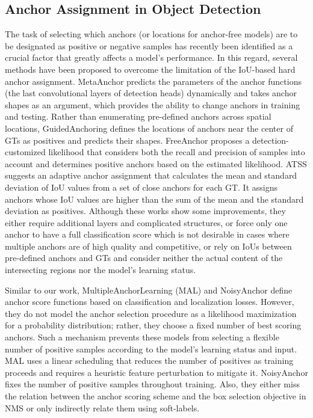 \documentclass[runningheads]{llncs}
\begin{document}
\subsection{Anchor Assignment in Object Detection}
The task of selecting which anchors (or locations for anchor-free models) are to be designated as positive or negative samples has recently been identified as a crucial factor that greatly affects a model's performance\cite{metaanchor, freeanchor, atss}. In this regard, several methods have been proposed to overcome the limitation of the IoU-based hard anchor assignment. MetaAnchor\cite{metaanchor} predicts the parameters of the anchor functions (the last convolutional layers of detection heads) dynamically and takes anchor shapes as an argument, which provides the ability to change anchors in training and testing. Rather than enumerating pre-defined anchors across spatial locations, GuidedAnchoring\cite{guidedanchor} defines the locations of anchors near the center of GTs as positives and predicts their shapes. FreeAnchor\cite{freeanchor} proposes a detection-customized likelihood that considers both the recall and precision of samples into account and determines positive anchors based on the estimated likelihood. ATSS\cite{atss} suggests an adaptive anchor assignment that calculates the mean and standard deviation of IoU values from a set of close anchors for each GT. It assigns anchors whose IoU values are higher than the sum of the mean and the standard deviation as positives. Although these works show some improvements, they either require additional layers and complicated structures\cite{guidedanchor, metaanchor}, or force only one anchor to have a full classification score which is not desirable in cases where multiple anchors are of high quality and competitive\cite{freeanchor}, or rely on IoUs between pre-defined anchors and GTs and consider neither the actual content of the intersecting regions nor the model's learning status\cite{atss}.

Similar to our work, MultipleAnchorLearning (MAL)\cite{mal} and NoisyAnchor\cite{noisy} define anchor score functions based on classification and localization losses. However, they do not model the anchor selection procedure as a likelihood maximization for a probability distribution; rather, they choose a fixed number of best scoring anchors. Such a mechanism prevents these models from selecting a flexible number of positive samples according to the model's learning status and input. MAL uses a linear scheduling that reduces the number of positives as training proceeds and requires a heuristic feature perturbation to mitigate it. NoisyAnchor fixes the number of positive samples throughout training. Also, they either miss the relation between the anchor scoring scheme and the box selection objective in NMS\cite{mal} or only indirectly relate them using soft-labels\cite{noisy}.
\end{document}
